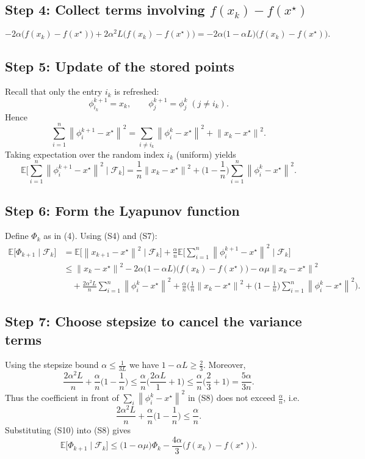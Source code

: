 \documentclass{article}
\newcommand{\E}{\mathbb{E}}
\newcommand{\norm}[1]{\left\|#1\right\|}
\begin{document}
\subsection*{Step 4: Collect terms involving $f(x_k)-f(x^\star)$}
\[
-2\alpha\big(f(x_k)-f(x^\star)\big)+2\alpha^2L\big(f(x_k)-f(x^\star)\big)
= -2\alpha\big(1-\alpha L\big)\big(f(x_k)-f(x^\star)\big).
\tag{S5}
\]

\subsection*{Step 5: Update of the stored points}
Recall that only the entry $i_k$ is refreshed:
\[
\phi_{i_k}^{k+1}=x_k,\qquad
\phi_{j}^{k+1}=\phi_j^{k}\;(j\neq i_k).
\]
Hence
\[
\sum_{i=1}^{n}\norm{\phi_i^{k+1}-x^\star}^2
= \sum_{i\neq i_k}\norm{\phi_i^{k}-x^\star}^2+\norm{x_k-x^\star}^2 .
\tag{S6}
\]
Taking expectation over the random index $i_k$ (uniform) yields
\[
\E\!\Big[\sum_{i=1}^{n}\norm{\phi_i^{k+1}-x^\star}^2\mid\mathcal{F}_k\Big]
= \frac{1}{n}\norm{x_k-x^\star}^2+\Big(1-\frac{1}{n}\Big)\sum_{i=1}^{n}\norm{\phi_i^{k}-x^\star}^2 .
\tag{S7}
\]

\subsection*{Step 6: Form the Lyapunov function}
Define $\Phi_k$ as in (4). Using (S4) and (S7):
\begin{align}
\E\!\big[\Phi_{k+1}\mid\mathcal{F}_k\big]
&=\E\!\big[\norm{x_{k+1}-x^\star}^2\mid\mathcal{F}_k\big]
   +\frac{\alpha}{n}\E\!\Big[\sum_{i=1}^{n}\norm{\phi_i^{k+1}-x^\star}^2\mid\mathcal{F}_k\Big]\nonumber\\
&\le \norm{x_k-x^\star}^2
   -2\alpha\big(1-\alpha L\big)\big(f(x_k)-f(x^\star)\big)
   -\alpha\mu\norm{x_k-x^\star}^2 \nonumber\\
&\quad +\frac{2\alpha^2L}{n}\sum_{i=1}^{n}\norm{\phi_i^{k}-x^\star}^2
   +\frac{\alpha}{n}\Big(\frac{1}{n}\norm{x_k-x^\star}^2+\Big(1-\frac{1}{n}\Big)\sum_{i=1}^{n}\norm{\phi_i^{k}-x^\star}^2\Big).
\tag{S8}
\end{align}

\subsection*{Step 7: Choose stepsize to cancel the variance terms}
Using the stepsize bound $\alpha\le\frac{1}{3L}$ we have $1-\alpha L\ge\frac23$.  
Moreover,
\[
\frac{2\alpha^2L}{n}+\frac{\alpha}{n}\Big(1-\frac{1}{n}\Big)
\le\frac{\alpha}{n}\Big(\frac{2\alpha L}{1} +1\Big)
\le\frac{\alpha}{n}\Big(\frac{2}{3}+1\Big)
=\frac{5\alpha}{3n}.
\tag{S9}
\]
Thus the coefficient in front of $\sum_i\norm{\phi_i^{k}-x^\star}^2$ in (S8) does not exceed $\frac{\alpha}{n}$, i.e.
\[
\frac{2\alpha^2L}{n}+\frac{\alpha}{n}\Big(1-\frac{1}{n}\Big)\le\frac{\alpha}{n}.
\tag{S10}
\]
Substituting (S10) into (S8) gives
\[
\E\!\big[\Phi_{k+1}\mid\mathcal{F}_k\big]
\le \big(1-\alpha\mu\big)\Phi_k
   -\frac{4\alpha}{3}\big(f(x_k)-f(x^\star)\big).
\tag{S11}
\]
\end{document}
